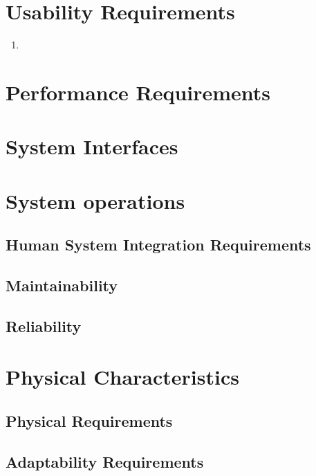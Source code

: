\documentclass[11pt, a4paper]{report}
\begin{document}
\section{Usability Requirements} \label{sec:Usability}


\begin{enumerate}[resume*=functional]
\item 
\end{enumerate}
\section{Performance Requirements} \label{sec:Performance}

\section{System Interfaces} \label{sec:Interfaces}

\section{System operations} \label{sec:Operations}

\subsection{Human System Integration Requirements} \label{subsec:HSI}

\subsection{Maintainability} \label{subsec:Maintainability}

\subsection{Reliability} \label{subsec:Reliability}

\section{Physical Characteristics}

\subsection{Physical Requirements}

\subsection{Adaptability Requirements}
\end{document}
